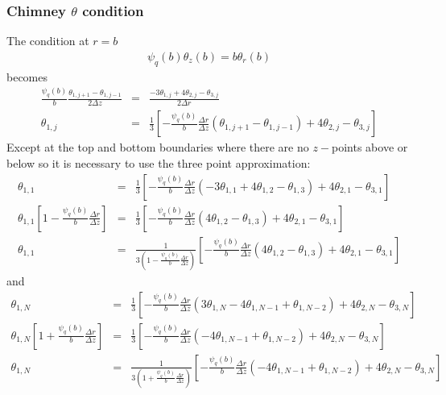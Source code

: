 \documentclass{article}
\begin{document}
\subsubsection{Chimney $\theta$ condition}
The condition at $r=b$
\begin{eqnarray}
\psi_q(b) \theta_z(b) = b \theta_r(b)
\end{eqnarray}
becomes
\begin{eqnarray}
\frac{ \psi_q(b) }{b} \frac{\theta_{1, j+1} - \theta_{1, j-1}}{2 \Delta z} &=& \frac{-3 \theta_{1, j} + 4 \theta_{2, j}- \theta_{3, j}}{2 \Delta r} \\
\theta_{1, j} &=& \frac{1}{3} \left[ - \frac{ \psi_q(b) }{b} \frac{\Delta r}{\Delta z} \left( \theta_{1, j+1} - \theta_{1, j-1} \right) + 4 \theta_{2,j} - \theta_{3, j} \right]
\end{eqnarray}
Except at the top and bottom boundaries where there are no $z-$points above or below so it is necessary to use the three point approximation:
\begin{eqnarray}
\theta_{1, 1} &=& \frac{1}{3} \left[ - \frac{ \psi_q(b) }{b} \frac{\Delta r}{\Delta z} \left( -3 \theta_{1, 1} + 4 \theta_{1, 2} - \theta_{1,3} \right) + 4 \theta_{2,1} - \theta_{3, 1} \right] \\
\theta_{1, 1} \left[1 - \frac{ \psi_q(b) }{b} \frac{\Delta r}{\Delta z} \right] &=& \frac{1}{3} \left[ - \frac{ \psi_q(b) }{b} \frac{\Delta r}{\Delta z} \left( 4 \theta_{1, 2} - \theta_{1,3} \right) + 4 \theta_{2,1} - \theta_{3, 1} \right] \\
\theta_{1, 1}&=& \frac{1}{3  \left(1 - \frac{ \psi_q(b) }{b} \frac{\Delta r}{\Delta z} \right) } \left[ - \frac{ \psi_q(b) }{b} \frac{\Delta r}{\Delta z} \left( 4 \theta_{1, 2} - \theta_{1,3} \right) + 4 \theta_{2,1} - \theta_{3, 1} \right]
\end{eqnarray}
and
\begin{eqnarray}
\theta_{1, N} &=& \frac{1}{3} \left[ - \frac{ \psi_q(b) }{b} \frac{\Delta r}{\Delta z} \left( 3 \theta_{1, N} - 4 \theta_{1, N-1} + \theta_{1,N-2} \right) + 4 \theta_{2,N} - \theta_{3, N} \right] \\
\theta_{1, N} \left[1 + \frac{ \psi_q(b) }{b} \frac{\Delta r}{\Delta z} \right] &=& \frac{1}{3} \left[ - \frac{ \psi_q(b) }{b} \frac{\Delta r}{\Delta z} \left( - 4 \theta_{1, N-1} + \theta_{1,N-2} \right) + 4 \theta_{2,N} - \theta_{3, N} \right] \\
\theta_{1, N}&=& \frac{1}{3  \left(1 + \frac{ \psi_q(b) }{b} \frac{\Delta r}{\Delta z} \right) } \left[ - \frac{ \psi_q(b) }{b} \frac{\Delta r}{\Delta z} \left( - 4 \theta_{1, N-1} + \theta_{1,N-2} \right) + 4 \theta_{2,N} - \theta_{3, N} \right]
\end{eqnarray}
\end{document}

